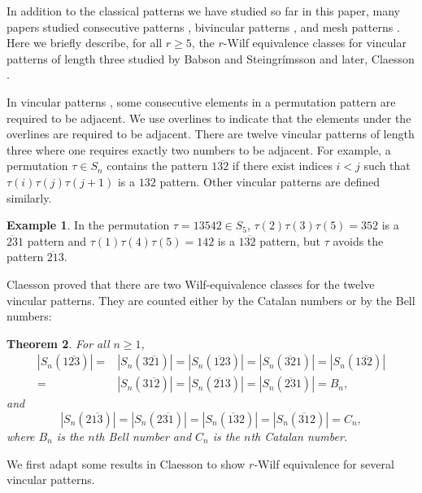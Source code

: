 \documentclass[11pt]{article}
\newtheorem{theorem}{Theorem}[section]
\theoremstyle{definition}
\newtheorem{example}[theorem]{Example}
\numberwithin{equation}{section}
\begin{document}
In addition to the classical patterns we have studied so far in this paper, many papers studied consecutive patterns \cite{ElizaldeNoy2003}, bivincular patterns \cite{BCDK2010}, and mesh patterns \cite{BrandenClaesson2011,HJSVU2015}. Here we briefly describe, for all $r\geq5$, the $r$-Wilf equivalence classes for vincular patterns of length three studied by Babson and Steingrímsson \cite{BabsonSteingrimsson2000} and later, Claesson \cite{Claesson2001}. 

In vincular patterns \cite[Section 2]{HJSVU2015}, some consecutive elements in a permutation pattern are required to be adjacent. We use overlines to indicate that the elements under the overlines are required to be adjacent. There are 
twelve vincular patterns of length three where one requires exactly two numbers to be adjacent. For example, a permutation $\tau\in S_n$ contains the pattern $1\overline{32}$ if there exist indices $i<j$ such that $\tau(i)\tau(j)\tau(j+1)$ is a $132$ pattern. Other vincular patterns are defined similarly.

\begin{example}
    In the permutation $\tau=13542\in S_5$, $\tau(2)\tau(3)\tau(5)=352$ is a $\overline{23}1$ pattern and $\tau(1)\tau(4)\tau(5)=142$ is a $1\overline{32}$ pattern, but $\tau$ avoids the pattern $\overline{21}3$.
\end{example}
Claesson \cite[Propositions 1-3 and Lemma 2]{Claesson2001} proved that there are two Wilf-equivalence classes for the 
twelve vincular patterns. They are counted either by the Catalan numbers or by the Bell numbers:

\begin{theorem}\label{Theorem:GeneralizedSingle3}
For all $n\geq1$,
\[
\begin{split}
|S_n(1\overline{23})|=&|S_n(3\overline{21})|=|S_n(\overline{12}3)|=|S_n(\overline{32}1)|=|S_n(1\overline{32})|\\=&|S_n(3\overline{12})|=|S_n(\overline{21}3)|=|S_n(\overline{23}1)|=B_n,
\end{split}
\]
and
\[
|S_n(2\overline{13})|=|S_n(2\overline{31})|=|S_n(\overline{13}2)|=|S_n(\overline{31}2)|=C_n,
\]
where $B_n$ is the $n$th Bell number and $C_n$ is the $n$th Catalan number.
\end{theorem}

We first adapt some results in Claesson \cite{Claesson2001} to show $r$-Wilf equivalence for several vincular patterns.
\end{document}
